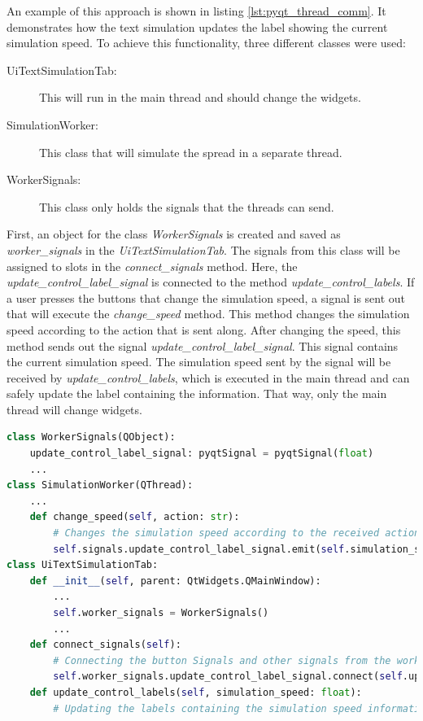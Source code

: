 An example of this approach is shown in listing \ref{lst:pyqt_thread_comm}. It demonstrates how the text simulation updates the label showing the current simulation speed. To achieve this functionality, three different classes were used:
\begin{description}
    \item[UiTextSimulationTab:] This will run in the main thread and should change the widgets.
    \item[SimulationWorker:] This class that will simulate the spread in a separate thread.
    \item[WorkerSignals:] This class only holds the signals that the threads can send.
\end{description}
First, an object for the class \textit{WorkerSignals} is created and saved as \textit{worker\_signals} in the \textit{UiTextSimulationTab}. The signals from this class will be assigned to slots in the \textit{connect\_signals} method. Here, the \textit{update\_control\_label\_signal} is connected to the method \textit{update\_control\_labels}. If a user presses the buttons that change the simulation speed, a signal is sent out that will execute the \textit{change\_speed} method. This method changes the simulation speed according to the action that is sent along. After changing the speed, this method sends out the signal \textit{update\_control\_label\_signal}. This signal contains the current simulation speed. The simulation speed sent by the signal will be received by \textit{update\_control\_labels}, which is executed in the main thread and can safely update the label containing the information. That way, only the main thread will change widgets.
\begin{lstlisting}[language=python, caption={Thread safety example}, label={lst:pyqt_thread_comm}]
class WorkerSignals(QObject):
    update_control_label_signal: pyqtSignal = pyqtSignal(float)
    ...
class SimulationWorker(QThread):
    ...
    def change_speed(self, action: str):
        # Changes the simulation speed according to the received action.
        self.signals.update_control_label_signal.emit(self.simulation_speed)
class UiTextSimulationTab:
    def __init__(self, parent: QtWidgets.QMainWindow):
        ... 
        self.worker_signals = WorkerSignals()
        ...
    def connect_signals(self):
        # Connecting the button Signals and other signals from the worker_signals
        self.worker_signals.update_control_label_signal.connect(self.update_control_labels)
    def update_control_labels(self, simulation_speed: float):
        # Updating the labels containing the simulation speed information.
\end{lstlisting}

